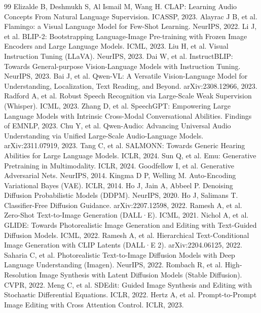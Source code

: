 \documentclass[UTF8,a4paper,zihao=-4,oneside,openany]{ctexbook}
\begin{document}
\begin{thebibliography}{99}
   Elizalde B, Deshmukh S, Al Ismail M, Wang H. CLAP: Learning Audio Concepts From Natural Language Supervision. ICASSP, 2023.
   Alayrac J B, et al. Flamingo: a Visual Language Model for Few-Shot Learning. NeurIPS, 2022.
   Li J, et al. BLIP-2: Bootstrapping Language-Image Pre-training with Frozen Image Encoders and Large Language Models. ICML, 2023.
   Liu H, et al. Visual Instruction Tuning (LLaVA). NeurIPS, 2023.
   Dai W, et al. InstructBLIP: Towards General-purpose Vision-Language Models with Instruction Tuning. NeurIPS, 2023.
   Bai J, et al. Qwen-VL: A Versatile Vision-Language Model for Understanding, Localization, Text Reading, and Beyond. arXiv:2308.12966, 2023.
   Radford A, et al. Robust Speech Recognition via Large-Scale Weak Supervision (Whisper). ICML, 2023.
   Zhang D, et al. SpeechGPT: Empowering Large Language Models with Intrinsic Cross-Modal Conversational Abilities. Findings of EMNLP, 2023.
   Chu Y, et al. Qwen-Audio: Advancing Universal Audio Understanding via Unified Large-Scale Audio-Language Models. arXiv:2311.07919, 2023.
   Tang C, et al. SALMONN: Towards Generic Hearing Abilities for Large Language Models. ICLR, 2024.
   Sun Q, et al. Emu: Generative Pretraining in Multimodality. ICLR, 2024.
   Goodfellow I, et al. Generative Adversarial Nets. NeurIPS, 2014.
   Kingma D P, Welling M. Auto-Encoding Variational Bayes (VAE). ICLR, 2014.
   Ho J, Jain A, Abbeel P. Denoising Diffusion Probabilistic Models (DDPM). NeurIPS, 2020.
   Ho J, Salimans T. Classifier-Free Diffusion Guidance. arXiv:2207.12598, 2022.
   Ramesh A, et al. Zero-Shot Text-to-Image Generation (DALL·E). ICML, 2021.
   Nichol A, et al. GLIDE: Towards Photorealistic Image Generation and Editing with Text-Guided Diffusion Models. ICML, 2022.
   Ramesh A, et al. Hierarchical Text-Conditional Image Generation with CLIP Latents (DALL·E 2). arXiv:2204.06125, 2022.
   Saharia C, et al. Photorealistic Text-to-Image Diffusion Models with Deep Language Understanding (Imagen). NeurIPS, 2022.
   Rombach R, et al. High-Resolution Image Synthesis with Latent Diffusion Models (Stable Diffusion). CVPR, 2022.
   Meng C, et al. SDEdit: Guided Image Synthesis and Editing with Stochastic Differential Equations. ICLR, 2022.
   Hertz A, et al. Prompt-to-Prompt Image Editing with Cross Attention Control. ICLR, 2023.

\end{thebibliography}
\end{document}

